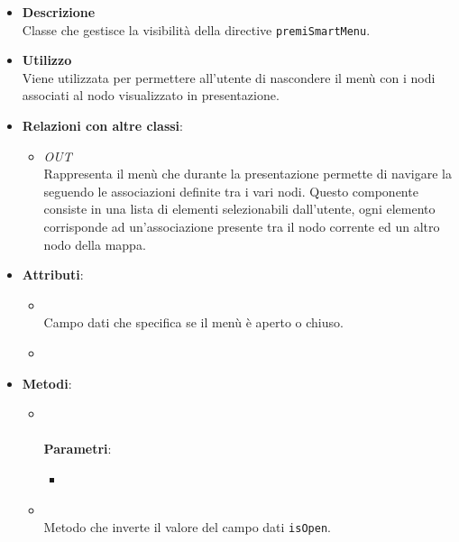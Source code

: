 \begin{itemize}
\item \textbf{Descrizione}\\
Classe che gestisce la visibilità della directive \texttt{premiSmartMenu}.
\item \textbf{Utilizzo}\\
Viene utilizzata per permettere all'utente di nascondere il menù con i nodi associati al nodo visualizzato in presentazione.
\item \textbf{Relazioni con altre classi}:
\begin{itemize}
\item \textit{OUT} \hyperref[\nogloxy{Premi::Front-End::Directives::premiSmartMenu}]{}\\
Rappresenta il menù che durante la presentazione permette di navigare la  seguendo le associazioni definite tra i vari nodi.
Questo componente consiste in una lista di elementi selezionabili dall’utente, ogni elemento corrisponde ad un'associazione presente tra il nodo corrente ed un altro nodo della mappa.
\end{itemize}
\item \textbf{Attributi}:
\begin{itemize}
\item {}
\\ Campo dati che specifica se il menù è aperto o chiuso.
\item {}
\\ \dpScopeField
\end{itemize}
\item \textbf{Metodi}:
\begin{itemize}
\item {}
\\ \dpConstructor
\\ \textbf{Parametri}:
\begin{itemize}
\item {}
\\ \dpScopeParam
\end{itemize}
\item {}
\\ Metodo che inverte il valore del campo dati \texttt{isOpen}.
\end{itemize}
\end{itemize}
\subsection{}
\label{\nogloxy{Premi::Front-End::Directives}}
